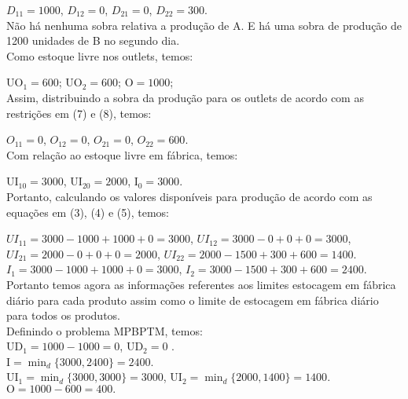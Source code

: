 \documentclass[authoryear,preprint,12pt]{elsarticle}
\begin{document}
$D_{11} = 1000$,
$D_{12} = 0$,
$D_{21} = 0$,
$D_{22} = 300$. \\

Não há nenhuma sobra relativa a produção de A. E há uma sobra de produção de 1200 unidades de B no segundo dia. \\

Como estoque livre nos outlets, temos:

$\textrm{UO}_{1} = 600$;
$\textrm{UO}_{2} = 600$;
$\textrm{O} = 1000$; \\

Assim, distribuindo a sobra da produção para os outlets de acordo com as restrições em (7) e (8), temos:

$O_{11} = 0$,
$O_{12} = 0$,
$O_{21} = 0$,
$O_{22} = 600$. \\

Com relação ao estoque livre em fábrica, temos:

$\textrm{UI}_{10} = 3000$,
$\textrm{UI}_{20} = 2000$,
$\textrm{I}_{0} = 3000$. \\

Portanto, calculando os valores disponíveis para produção de acordo com as equações em (3), (4) e (5), temos:

$UI_{11} = 3000 - 1000 + 1000 + 0 =  3000$,
$UI_{12} = 3000 - 0 + 0 + 0 =  3000$,
$UI_{21} = 2000 - 0 + 0 + 0 =  2000$,
$UI_{22} = 2000 - 1500 + 300 + 600 =  1400$. \\

$I_{1} = 3000 - 1000 + 1000 + 0 = 3000$,
$I_{2} = 3000 - 1500 + 300 + 600 = 2400$. \\

Portanto temos agora as informações referentes aos limites estocagem em fábrica diário para cada produto assim como o limite de estocagem em fábrica diário para todos os produtos. \\

Definindo o problema MPBPTM, temos: \\

$\textrm{UD}_{1} = 1000 - 1000 = 0$,
$\textrm{UD}_{2} = 0$ . \\

$\textrm{I} = \min_{d} \{3000, 2400\} = 2400$. \\

$ \textrm{UI}_{1} = \min_{d} \{3000, 3000\} = 3000 $,
$ \textrm{UI}_{2} = \min_{d} \{2000, 1400\} = 1400 $. \\

$\textrm{O} = 1000 - 600 = 400.$ \\
\end{document}
